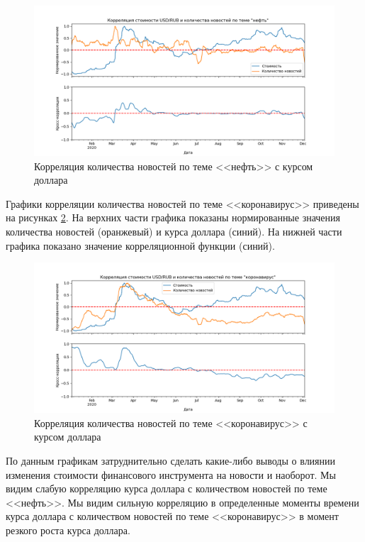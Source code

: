 \begin{figure}[h]
    \centering
    \includegraphics[width=\linewidth]{images/correlations/absolute/нефть.png}
    \caption{Корреляция количества новостей по теме <<нефть>> с курсом доллара}
    \label{img:correlation-absolute-oil}
\end{figure}

Графики корреляции количества новостей по теме <<коронавирус>> приведены на рисунках \ref{img:correlation-absolute-covid}. На верхних части графика показаны нормированные значения количества новостей (оранжевый) и курса доллара (синий). На нижней части графика показано значение корреляционной функции (синий).

\begin{figure}[h]
    \centering
    \includegraphics[width=\linewidth]{images/correlations/absolute/коронавирус.png}
    \caption{Корреляция количества новостей по теме <<коронавирус>> с курсом доллара}
    \label{img:correlation-absolute-covid}
\end{figure}

По данным графикам затруднительно сделать какие-либо выводы о влиянии изменения стоимости финансового инструмента на новости и наоборот. Мы видим слабую корреляцию курса доллара с количеством новостей по теме <<нефть>>. Мы видим сильную корреляцию в определенные моменты времени курса доллара с количеством новостей по теме <<коронавирус>> в момент резкого роста курса доллара.

